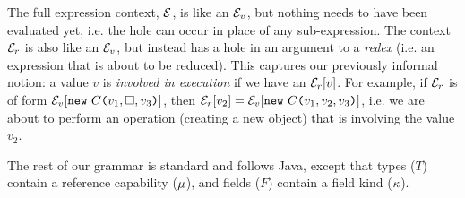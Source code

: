 The full expression context, $\mathcal{E}$, is like an $\mathcal{E}_v{}$, but nothing needs to have been evaluated yet, i.e. the hole can occur in place of any sub-expression.
The context $\mathcal{E}_r{}$ is also like an $\mathcal{E}_v{}$, but instead has a hole in an argument to a \emph{redex} (i.e. an expression that is about to be reduced).
	This captures our previously informal notion: a value $v$ is \emph{involved in execution} if we have an $\mathcal{E}_r{}[v]$.
	For example, if $\mathcal{E}_r{}$ is of form $\mathcal{E}_v{}[\texttt{new}\ C\texttt{(} v_1,\square,v_3\texttt{)}]$, then $\mathcal{E}_r{}[v_2] = \mathcal{E}_v{}[\texttt{new}\ C\texttt{(} v_1,v_2,v_3\texttt{)}]$, i.e. we are about to perform an operation (creating a new object) that is involving the value $v_2$.



The rest of our grammar is standard and follows Java, except that types ($T$) contain a reference capability ($\mu$), and fields ($F$) contain a field kind ($\kappa$).

